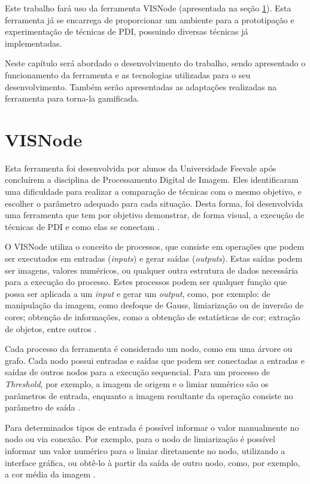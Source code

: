 \documentclass[
	12pt,				%
	oneside,			%
	a4paper,			%
	english,			%
	french,				%
	spanish,			%
	brazil,				%
	]{abntex2}
\begin{document}
Este trabalho fará uso da ferramenta VISNode (apresentada na seção \ref{sec:visnode}). Esta ferramenta já se encarrega de proporcionar um ambiente para a prototipação e experimentação de técnicas de PDI, possuindo diversas técnicas já implementadas. 

Neste capítulo será abordado o desenvolvimento do trabalho, sendo apresentado o funcionamento da ferramenta e as tecnologias utilizadas para o seu desenvolvimento. Também serão apresentadas as adaptações realizadas na ferramenta para torna-la gamificada.
   
\section{VISNode}
\label{sec:visnode}

Esta ferramenta foi desenvolvida por alunos da Universidade Feevale após concluírem a disciplina de Processamento Digital de Imagem. Eles identificaram uma dificuldade para realizar a comparação de técnicas com o mesmo objetivo, e escolher o parâmetro adequado para cada situação. Desta forma, foi desenvolvida uma ferramenta que tem por objetivo demonstrar, de forma visual,  a execução de técnicas de PDI e como elas se conectam \cite{visnode}.

O VISNode utiliza o conceito de processos, que consiste em operações que podem ser executados em entradas (\textit{inputs}) e gerar saídas (\textit{outputs}). Estas saídas podem ser imagens, valores numéricos, ou qualquer outra estrutura de dados necessária para a execução do processo. Estes processos podem ser qualquer função que possa ser aplicada a um \textit{input} e gerar um \textit{output}, como, por exemplo: de manipulação da imagem, como desfoque de Gauss, limiarização ou de inversão de cores; obtenção de informações, como a obtenção de estatísticas de cor;  extração de objetos, entre outros \cite{visnode}.

Cada processo da ferramenta é considerado um nodo, como em uma árvore ou grafo. Cada nodo possui entradas e saídas que podem ser conectadas a entradas e saídas de outros nodos para a execução sequencial. Para um processo de \textit{Threshold}, por exemplo, a imagem de origem e o limiar numérico são os parâmetros de entrada, enquanto a imagem resultante da operação consiste no parâmetro de saída \cite{visnode}. 

Para determinados tipos de entrada é possível informar o valor manualmente no nodo ou via conexão. Por exemplo, para o nodo de limiarização é possível informar um valor numérico para o limiar diretamente no nodo, utilizando a interface gráfica, ou obtê-lo à partir da saída de outro nodo, como, por exemplo, a cor média da imagem \cite{visnode}.
\end{document}
